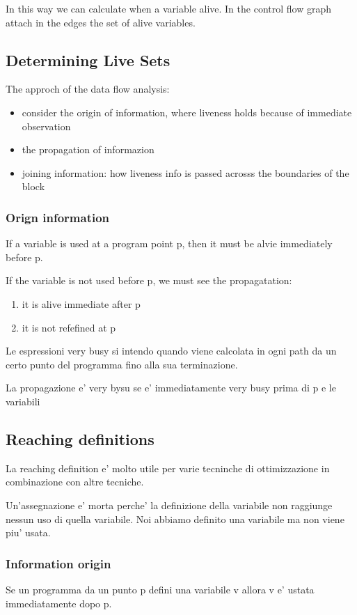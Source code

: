 In this way we can calculate when a variable alive. In the control flow graph
attach in the edges the set of alive variables.

\subsection{Determining Live Sets}
The approch of the data flow analysis:
\begin{itemize}
\item consider the origin of information, where liveness holds because of immediate
observation
\item the propagation of informazion
\item joining information: how liveness info is passed acrosss the boundaries
of the block
\end{itemize}

\subsubsection{Orign information}
If a variable is used at a program point p, then it must be alvie immediately
before p.

If the variable is not used before p, we must see the propagatation:
\begin{enumerate}
\item it is alive immediate after p
\item it is not refefined at p
\end{enumerate}

Le espressioni very busy si intendo quando viene calcolata in ogni path da un
certo punto del programma fino alla sua terminazione.

La propagazione e' very bysu se e' immediatamente very busy prima di p e le
variabili

\subsection{Reaching definitions}
La reaching definition e' molto utile per varie tecninche di ottimizzazione in
combinazione con altre tecniche.

Un'assegnazione e' morta perche' la definizione della variabile non raggiunge
nessun uso di quella variabile. Noi abbiamo definito una variabile ma non viene
piu' usata.

\subsubsection{Information origin}
Se un programma da un punto p defini una variabile v allora v e' ustata
immediatamente dopo p.
